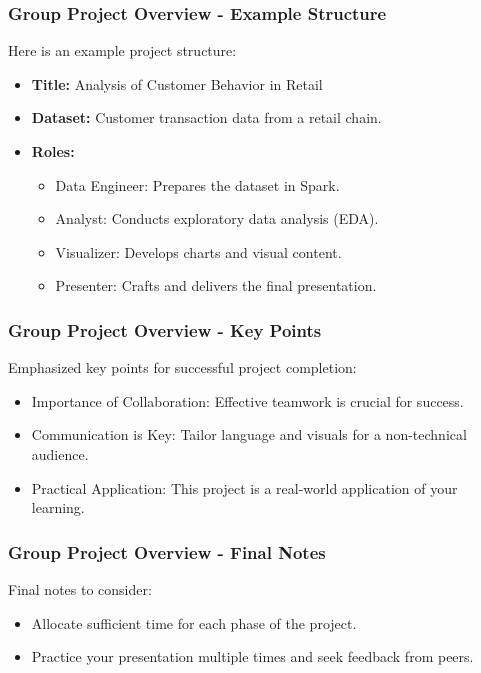 \documentclass[aspectratio=169]{beamer}
\begin{document}
\begin{frame}[fragile]
  \frametitle{Group Project Overview - Example Structure}
  Here is an example project structure:
  \begin{itemize}
    \item \textbf{Title:} Analysis of Customer Behavior in Retail
    \item \textbf{Dataset:} Customer transaction data from a retail chain.
    \item \textbf{Roles:}
      \begin{itemize}
        \item Data Engineer: Prepares the dataset in Spark.
        \item Analyst: Conducts exploratory data analysis (EDA).
        \item Visualizer: Develops charts and visual content.
        \item Presenter: Crafts and delivers the final presentation.
      \end{itemize}
  \end{itemize}
\end{frame}

\begin{frame}[fragile]
  \frametitle{Group Project Overview - Key Points}
  Emphasized key points for successful project completion:
  \begin{itemize}
    \item Importance of Collaboration: Effective teamwork is crucial for success.
    \item Communication is Key: Tailor language and visuals for a non-technical audience.
    \item Practical Application: This project is a real-world application of your learning.
  \end{itemize}
\end{frame}

\begin{frame}[fragile]
  \frametitle{Group Project Overview - Final Notes}
  Final notes to consider:
  \begin{itemize}
    \item Allocate sufficient time for each phase of the project.
    \item Practice your presentation multiple times and seek feedback from peers.
  \end{itemize}
\end{frame}
\end{document}
